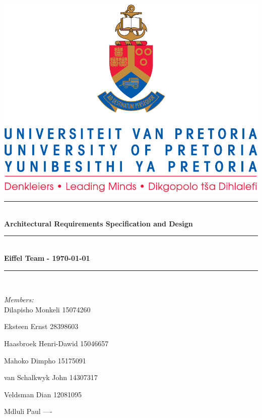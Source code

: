 \documentclass{article}
\begin{document}
	
\begin{titlepage}
	\newcommand{\HRule}{\rule{\linewidth}{0.5mm}} %

	\center %
	 

	\includegraphics[width=\textwidth]{./Images/front-page.jpg}


	\HRule \\[0.4cm]
	{ \huge \bfseries Architectural Requirements Specification and Design}\\[0.4cm] %
	\HRule \\[0.5cm]
	{ \large \bfseries Eiffel Team }%
	{\large \bfseries - \today}\\
	\HRule \\[1.5cm]

	\begin{minipage}{0.5\textwidth}
	\emph{Members:}\\%
	Dilapisho Monkeli 15074260	
	
	Eksteen Ernst 28398603
	
	Haasbroek Henri-Dawid 15046657
	
	Mahoko  Dimpho 15175091
		
	van Schalkwyk John 14307317

	Veldsman Dian 12081095

	Mdluli Paul ----
	\end{minipage}
\end{titlepage}
\end{document}
